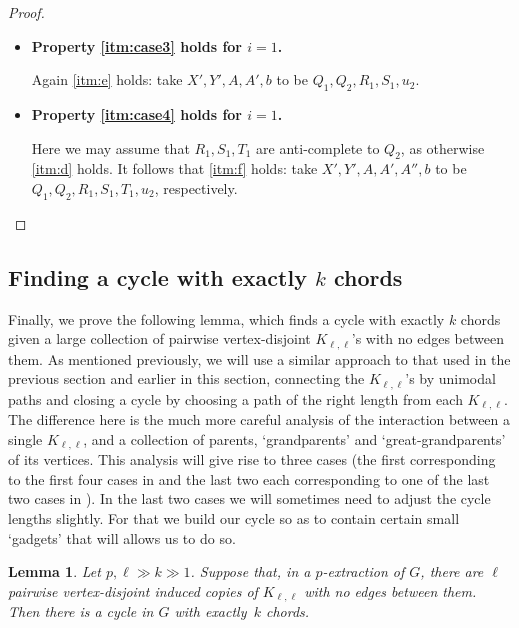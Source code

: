 \documentclass[11pt,english]{article}
\theoremstyle{plain}
\newtheorem{lem}[thm]{Lemma}
\theoremstyle{definition}
\theoremstyle{remark}
\begin{document}
\begin{proof}
\begin{itemize}
                Then \ref{itm:e} holds: take $X', Y', A, A', b$ to be $Q_1, Q_2, R_1, \{u_1\}, u_2$.
            \item
                {\bf Property \ref{itm:case3} holds for $i = 1$.}
                
                Again \ref{itm:e} holds: take $X', Y', A, A', b$ to be $Q_1, Q_2, R_1, S_1, u_2$.
            \item
                {\bf Property \ref{itm:case4} holds for $i = 1$.}
                
                Here we may assume that $R_1, S_1, T_1$ are anti-complete to $Q_2$, as otherwise \ref{itm:d} holds.
                It follows that \ref{itm:f} holds: take $X', Y', A, A', A'', b$ to be $Q_1, Q_2, R_1, S_1, T_1, u_2$, respectively. \qedhere
        \end{itemize}
    \end{proof}
                
        
    \subsection{Finding a cycle with exactly $k$ chords}
    
    Finally, we prove the following lemma, which finds a cycle with exactly $k$ chords given a large collection of pairwise vertex-disjoint $K_{\ell,\ell}$'s with no edges between them.
    As mentioned previously, we will use a similar approach to that used in the previous section and earlier in this section, connecting the $K_{\ell,\ell}$'s by unimodal paths and closing a cycle by choosing a path of the right length from each $K_{\ell,\ell}$. The difference here is the much more careful analysis of the interaction between a single $K_{\ell,\ell}$, and a collection of parents, `grandparents' and `great-grandparents' of its vertices. This analysis will give rise to three cases (the first corresponding to the first four cases in  and the last two each corresponding to one of the last two cases in ). In the last two cases we will sometimes need to adjust the cycle lengths slightly. For that we build our cycle so as to contain certain small `gadgets' that will allows us to do so.  
    
    \begin{lem} \label{lem:find-cycle-from-Kll-exact}
        Let $p, \ell \gg k \gg 1$. Suppose that, in a $p$-extraction of $G$, there are $\ell$ pairwise vertex-disjoint induced copies of $K_{\ell, \ell}$ with no edges between them. Then there is a cycle in $G$ with exactly~$k$ chords.
    \end{lem}
    
\end{document}

